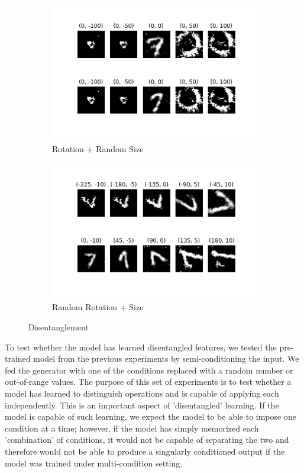 \documentclass[11pt, letterpaper, oneside]{article}
\begin{document}
\begin{figure}
    \begin{subfigure}{.5\textwidth}
      \centering
      \includegraphics[width=1\linewidth]{rotate_sizeZSL1.png}  
      \caption{Rotation + Random Size}
      \label{fig:sub-third}
    \end{subfigure}
    \begin{subfigure}{.5\textwidth}
      \centering
      \includegraphics[width=1\linewidth]{rotateZSL_size.png}
      \caption{Random Rotation + Size}
      \label{fig:sub-fourth}
    \end{subfigure}
    
\caption{Disentanglement}
\label{fig:fig}
\end{figure}

To test whether the model has learned disentangled features, we tested the pre-trained model from the previous experiments by semi-conditioning the input. We fed the generator with one of the conditions replaced with a random number or out-of-range values. The purpose of this set of experiments is to test whether a model has learned to distinguish operations and is capable of applying each independently. This is an important aspect of 'disentangled' learning. If the model is capable of such learning, we expect the model to be able to impose one condition at a time; however, if the model has simply memorized each 'combination' of conditions, it would not be capable of separating the two and therefore would not be able to produce a singularly conditioned output if the model was trained under multi-condition setting. 
\end{document}
